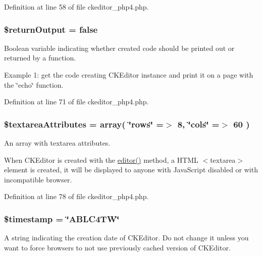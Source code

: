 Definition at line 58 of file ckeditor\_\-php4.php.

\hypertarget{classCKEditor_a5970de8e632edcc5a145c18382ad5f86}{
\subsubsection[{\$returnOutput}]{\setlength{\rightskip}{0pt plus 5cm}\${\bf returnOutput} = false}}
\label{classCKEditor_a5970de8e632edcc5a145c18382ad5f86}
Boolean variable indicating whether created code should be printed out or returned by a function.

Example 1: get the code creating CKEditor instance and print it on a page with the \char`\"{}echo\char`\"{} function. 
 

Definition at line 71 of file ckeditor\_\-php4.php.

\hypertarget{classCKEditor_a98562b08f6a3c136e6478d9f563fb2ea}{
\subsubsection[{\$textareaAttributes}]{\setlength{\rightskip}{0pt plus 5cm}\${\bf textareaAttributes} = {\bf array}( \char`\"{}rows\char`\"{} =$>$ 8, \char`\"{}cols\char`\"{} =$>$ 60 )}}
\label{classCKEditor_a98562b08f6a3c136e6478d9f563fb2ea}
An array with textarea attributes.

When CKEditor is created with the \hyperlink{classCKEditor_a7379361d078919956eb2ce371f0e85d9}{editor()} method, a HTML $<$textarea$>$ element is created, it will be displayed to anyone with JavaScript disabled or with incompatible browser. 

Definition at line 78 of file ckeditor\_\-php4.php.

\hypertarget{classCKEditor_a2b69de9676dd97c675cd4d9bcceb684c}{
\subsubsection[{\$timestamp}]{\setlength{\rightskip}{0pt plus 5cm}\${\bf timestamp} = \char`\"{}ABLC4TW\char`\"{}}}
\label{classCKEditor_a2b69de9676dd97c675cd4d9bcceb684c}
A string indicating the creation date of CKEditor. Do not change it unless you want to force browsers to not use previously cached version of CKEditor. 

